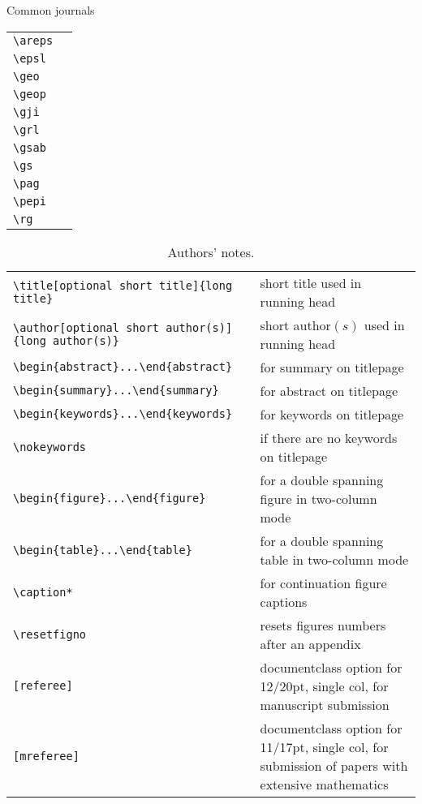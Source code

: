 Common journals
\newline
\begin{tabular}{ll}
\verb"\areps" & \areps{} \\
\verb"\epsl"  & \epsl{} \\
\verb"\geo"   & \geo{} \\
\verb"\geop"  & \geop{} \\
\verb"\gji"   & \gji{} \\
\verb"\grl"   & \grl{} \\
\verb"\gsab"  & \gsab{} \\
\verb"\gs"    & \gs{} \\
\verb"\pag"   & \pag{} \\
\verb"\pepi"  & \pepi{} \\
\verb"\rg"    & \rg{} \\
\end{tabular}
%
%
\begin{table*}
\begin{minipage}{130mm}
\caption{Authors' notes.}\label{authors}
\begin{tabular}{@{}ll}
\verb"\title[optional short title]{long title}"
                    & short title used in running head\\
\verb"\author[optional short author(s)]{long author(s)}"
                    & short author$(s)$ used in running head\\
\verb"\begin{abstract}...\end{abstract}"& for summary on titlepage\\
\verb"\begin{summary}...\end{summary}"& for abstract on titlepage\\
\verb"\begin{keywords}...\end{keywords}"& for keywords on titlepage\\
\verb"\nokeywords"  & if there are no keywords on titlepage\\
\verb"\begin{figure*}...\end{figure*}" & for a double spanning figure in two-column mode\\
\verb"\begin{table*}...\end{table*}" & for a double spanning table in
                                       two-column mode\\
\verb"\caption*"    & for continuation figure captions\\
\verb"\resetfigno" & resets figures numbers after an appendix\\
\verb"[referee]" & documentclass option for 12/20pt, single col,
                   for manuscript submission\\
\verb"[mreferee]" & documentclass option for 11/17pt, single col,
                   for submission of papers with extensive mathematics\\
\end{tabular}
\end{minipage}
\end{table*}
